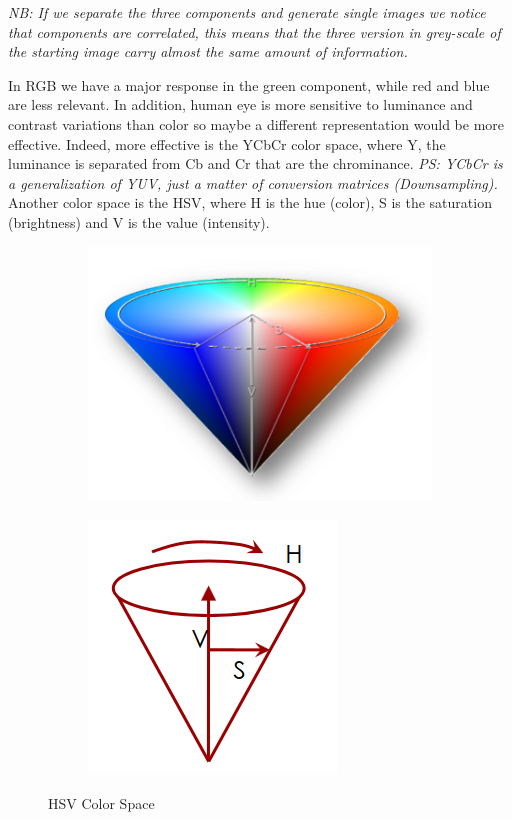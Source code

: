 \textit{NB: If we separate the three components and generate single images we notice that components are correlated, this means that the three version in grey-scale of the starting image carry almost the same amount of information.}

In RGB we have a major response in the green component, while red and blue are less relevant. In addition, human eye is more sensitive to luminance and contrast variations than color so maybe a different representation would be more effective.
Indeed, more effective is the YCbCr color space, where Y, the luminance is separated from Cb and Cr that are the chrominance.
\textit{PS: YCbCr is a generalization of YUV, just a matter of conversion matrices (Downsampling).}
\\
Another color space is the HSV, where H is the hue (color), S is the saturation (brightness) and V is the value (intensity).

\begin{figure}[h]
    \begin{subfigure}{0.5\textwidth}
        \includegraphics[scale=0.4]{Figures/HSV1.png} 
        \label{fig:subim1}
    \end{subfigure}
    \begin{subfigure}{0.5\textwidth}
        \includegraphics[scale=0.5]{Figures/HSV2.png}
        \label{fig:subim2}
    \end{subfigure}
        
        \caption{HSV Color Space}
        \label{fig:image2}
\end{figure}

